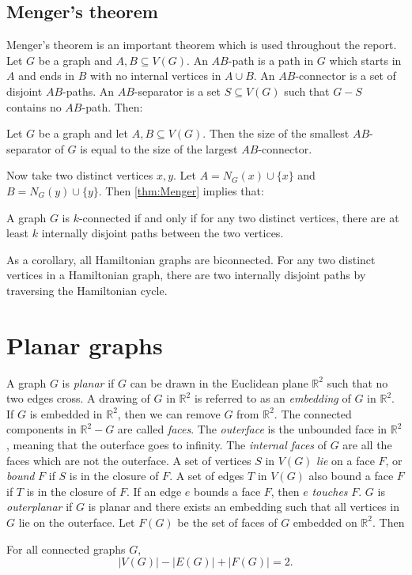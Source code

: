 \subsection{Menger's theorem}
Menger's theorem \cite{mengerZurAllgemeinenKurventheorie1927} is an important theorem which is used throughout the report.
Let \(G\) be a graph and \(A, B \subseteq V(G)\). An \(AB\)-path is a path in \(G\) which starts in \(A\) and ends in \(B\) with no internal vertices in \(A \cup B\). An \(AB\)-connector is a set of disjoint \(AB\)-paths. An \(AB\)-separator is a set \(S \subseteq V(G)\) such that \(G - S\) contains no \(AB\)-path. Then:
\begin{theorem}\label{thm:Menger}
	Let $G$ be a graph and let $A, B \subseteq V(G)$. Then the size of the smallest \(AB\)-separator of \(G\) is equal to the size of the largest \(AB\)-connector.
\end{theorem}
Now take two distinct vertices \(x, y\). Let \(A = N_G(x) \cup \{x\} \) and \(B = N_G(y) \cup \{y\} \). Then \cref{thm:Menger} implies that:
\begin{theorem}\label{thm:Menger_Vertex}
	A graph \(G\) is \(k\)-connected if and only if for any two distinct vertices, there are at least \(k\) internally disjoint paths between the two vertices.
\end{theorem}
As a corollary, all Hamiltonian graphs are biconnected. For any two distinct vertices in a Hamiltonian graph, there are two internally disjoint paths by traversing the Hamiltonian cycle.

\section{Planar graphs}\label{sec:Planar graphs}
A graph \(G\) is \textit{planar} if \(G\) can be drawn in the Euclidean plane \( \mathbb{R}^2 \) such that no two edges cross. A drawing of $G$ in $\mathbb{R}^2$ is referred to as an \textit{embedding} of $G$ in $\mathbb{R}^2$. If \(G\) is embedded in \(\mathbb{R}^2 \), then we can remove $G$ from $\mathbb{R}^2$. The connected components in $\mathbb{R}^2 - G$ are called \textit{faces}. The \textit{outerface} is the unbounded face in $\mathbb{R}^2$, meaning that the outerface goes to infinity. The \textit{internal faces} of $G$ are all the faces which are not the outerface. A set of vertices $S$ in $V(G)$ \textit{lie} on a face $F$, or \textit{bound} $F$ if $S$ is in the closure of $F$. A set of edges $T$ in $V(G)$ also bound a face $F$ if $T$ is in the closure of $F$. If an edge $e$ bounds a face $F$, then $e$ \textit{touches} $F$. \(G\) is \textit{outerplanar} if \(G\) is planar and there exists an embedding such that all vertices in \(G\) lie on the outerface.
Let \(F(G)\) be the set of faces of \(G\) embedded on \(\mathbb{R}^2\). Then
\begin{theorem}\label{thm:Euler_planar}
	For all connected graphs $G$,
	\begin{equation}
		|V(G)| - |E(G)| + |F(G)| = 2.
	\end{equation}
\end{theorem}

